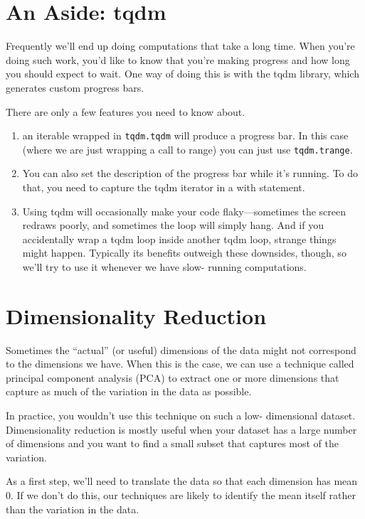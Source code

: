 \section{An Aside: tqdm}
Frequently we'll end up doing computations that take a long time. When you're doing such work, you'd like to know that you're making progress and how long you should
expect to wait. One way of doing this is with the tqdm library, which generates custom progress bars.

There are only a few features you need to know about.
\begin{enumerate}
    \item an iterable wrapped in \verb|tqdm.tqdm| will produce a progress bar. In this case (where we are just wrapping a call to range) you can just use \verb|tqdm.trange|.
    \item You can also set the description of the progress bar while it's running. To do that, you
          need to capture the tqdm iterator in a with statement.
    \item Using tqdm will occasionally make your code flaky—sometimes the screen redraws
          poorly, and sometimes the loop will simply hang. And if you accidentally wrap a tqdm
          loop inside another tqdm loop, strange things might happen. Typically its benefits
          outweigh these downsides, though, so we'll try to use it whenever we have slow-
          running computations.
\end{enumerate}

\section{Dimensionality Reduction}
Sometimes the ``actual'' (or useful) dimensions of the data might not correspond to the dimensions we have. When this is the case, we can use a technique called principal component analysis
(PCA) to extract one or more dimensions that capture as much of the variation in the
data as possible.

\begin{tcolorbox}
    In practice, you wouldn't use this technique on such a low-
    dimensional dataset. Dimensionality reduction is mostly useful
    when your dataset has a large number of dimensions and you want
    to find a small subset that captures most of the variation.
\end{tcolorbox}

As a first step, we'll need to translate the data so that each dimension has mean 0. If we don't do this, our techniques are likely to identify the mean itself rather than
the variation in the data.